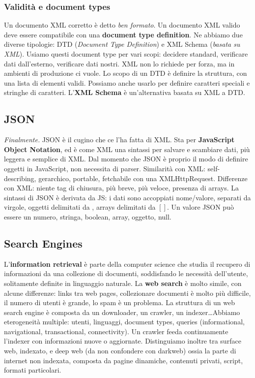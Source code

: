\documentclass[11pt]{article}
\begin{document}
\subsubsection{Validità e document types}
Un documento XML corretto è detto \textit{ben formato}. Un documento XML valido deve essere compatibile con una \textbf{document type definition}. Ne abbiamo due diverse tipologie: DTD (\textit{Document Type Definition}) e XML Schema (\textit{basata su XML}). Usiamo questi document type per vari scopi: decidere standard, verificare dati dall'esterno, verificare dati nostri. XML non lo richiede per forza, ma in ambienti di produzione ci vuole. Lo scopo di un DTD è definire la struttura, con una lista di elementi validi. Possiamo anche usarlo per definire caratteri speciali e stringhe di caratteri. L'\textbf{XML Schema} è un'alternativa basata su XML a DTD.

\subsection{JSON}
\textit{Finalmente.} JSON è il cugino che ce l'ha fatta di XML. Sta per \textbf{JavaScript Object Notation}, ed è come XML una sintassi per salvare e scambiare dati, più leggera e semplice di XML. Dal momento che JSON è proprio il modo di definire oggetti in JavaScript, non necessita di parser. Similarità con XML: self-describing, gerarchico, portable, fetchabile con una XMLHttpRequest. Differenze con XML: niente tag di chiusura, più breve, più veloce, presenza di arrays. La sintassi di JSON è derivata da JS: i dati sono accoppiati nome/valore, separati da virgole, oggetti delimitati da \textbraceleft\textbraceright, arrays delimitati da $[]$. Un valore JSON può essere un numero, stringa, boolean, array, oggetto, null.
\subsection{Search Engines}
L'\textbf{information retrieval} è parte della computer science che studia il recupero di informazioni da una collezione di documenti, soddisfando le necessità dell'utente, solitamente definite in linguaggio naturale. 
La \textbf{web search} è molto simile, con alcune differenze: links tra web pages, collezionare documenti è molto più difficile, il numero di utenti è grande, lo spam è un problema. La struttura di un web search engine è composta da un downloader, un crawler, un indexer\dots Abbiamo eterogeneità multiple: utenti, linguaggi, document types, queries (informational, navigational, transactional, connectivity). Un crawler feeda continuamente l'indexer con informazioni nuove o aggiornate. Distinguiamo inoltre tra surface web, indexato, e deep web (da non confondere con darkweb) ossia la parte di internet non indexata, composta da pagine dinamiche, contenuti privati, script, formati particolari. 
\end{document}
